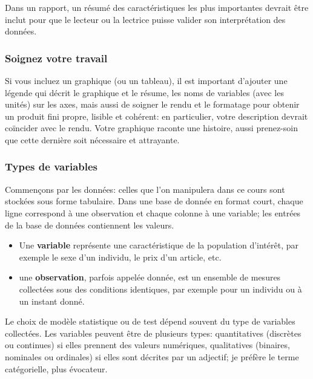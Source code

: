 \documentclass[
  11pt,
  letterpaper,
]{article}
\providecommand{\tightlist}{%
  \setlength{\itemsep}{0pt}\setlength{\parskip}{0pt}}
\theoremstyle{definition}
\theoremstyle{definition}
\theoremstyle{definition}
\theoremstyle{remark}
\begin{document}
Dans un rapport, un résumé des caractéristiques les plus importantes devrait être inclut pour que le lecteur ou la lectrice puisse valider son interprétation des données.

\hypertarget{soignez-votre-travail}{%
\subsubsection{Soignez votre travail}\label{soignez-votre-travail}}

Si vous incluez un graphique (ou un tableau), il est important d'ajouter une légende qui décrit le graphique et le résume, les noms de variables (avec les unités) sur les axes, mais aussi de soigner le rendu et le formatage pour obtenir un produit fini propre, lisible et cohérent: en particulier, votre description devrait coïncider avec le rendu. Votre graphique raconte une histoire, aussi prenez-soin que cette dernière soit nécessaire et attrayante.

\hypertarget{types-de-variables}{%
\subsubsection{Types de variables}\label{types-de-variables}}

Commençons par les données: celles que l'on manipulera dans ce cours sont stockées sous forme tabulaire. Dans une base de donnée en format court, chaque ligne correspond à une observation et chaque colonne à une variable; les entrées de la base de données contiennent les valeurs.

\begin{itemize}
\tightlist
\item
  Une \textbf{variable} représente une caractéristique de la population d'intérêt, par exemple le sexe d'un individu, le prix d'un article, etc.
\item
  une \textbf{observation}, parfois appelée donnée, est un ensemble de mesures collectées sous des conditions identiques, par exemple pour un individu ou à un instant donné.
\end{itemize}

Le choix de modèle statistique ou de test dépend souvent du type de variables collectées. Les variables peuvent être de plusieurs types: quantitatives (discrètes ou continues) si elles prennent des valeurs numériques, qualitatives (binaires, nominales ou ordinales) si elles sont décrites par un adjectif; je préfère le terme catégorielle, plus évocateur.
\end{document}
